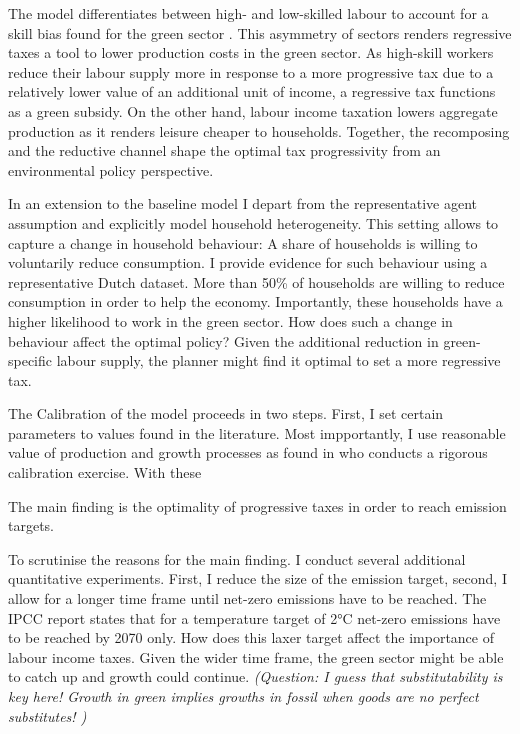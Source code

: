 The model differentiates between high- and low-skilled labour to account for a skill bias found for the green sector \citep{Consoli2016DoCapital}. This asymmetry of sectors renders regressive taxes a tool to lower production costs in the green sector. As high-skill workers reduce their labour supply more in response to a more progressive tax due to a relatively lower value of an additional unit of income, a regressive tax functions as a green subsidy. %
On the other hand, labour income taxation lowers aggregate production as it renders leisure cheaper to households. 
Together, the recomposing and the reductive channel shape the optimal tax progressivity from an environmental policy perspective. 

In an extension to the baseline model I depart from the representative agent assumption and explicitly model household heterogeneity. This setting allows to capture a change in household behaviour: A share of households is willing to voluntarily reduce consumption. I provide evidence for such behaviour using a representative Dutch dataset. More than 50\% of households are willing to reduce consumption in order to help the economy. Importantly, these households have a higher likelihood to work in the green sector. How does such a change in behaviour affect the optimal policy? Given the additional reduction in green-specific labour supply, the planner might find it optimal to set a more regressive tax.    

The Calibration of the model proceeds in two steps. First, I set certain parameters to values found in the literature. Most impportantly, I use reasonable value of production and growth processes as found in \cite{Fried2018ClimateAnalysis} who conducts a rigorous calibration exercise.  With these 

The main finding is the optimality of progressive taxes in order to reach emission targets. 


To scrutinise the reasons for the main finding. I conduct several additional quantitative experiments. First, I reduce the size of the emission target, second, I allow for a longer time frame until net-zero emissions have to be reached. The IPCC report states that for a temperature target of 2°C net-zero emissions have to be reached by 2070 only. How does this laxer target affect the importance of labour income taxes. Given the wider time frame, the green sector might be able to catch up and growth could continue. \textit{(Question: I guess that substitutability is key here! Growth in green implies growths in fossil when goods are no perfect substitutes! )}